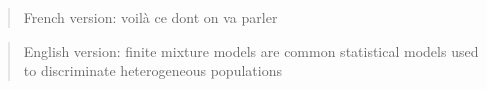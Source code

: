 \begin{abstract}
French version: voilà ce dont on va parler
\end{abstract}
\begin{abstract}
English version: finite mixture models are common statistical models used to discriminate heterogeneous populations
\end{abstract}
